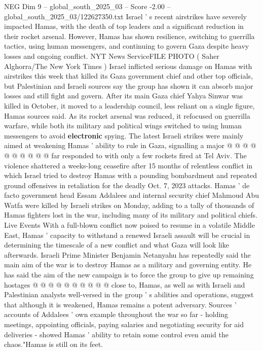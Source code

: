 \begin{textsample}{NEG Dim 9 – global\_south\_2025\_03 – Score -2.00 – global\_south\_2025\_03/122627350.txt}  \label{ex:f9_neg_325}
Israel ' s recent airstrikes have severely impacted Hamas, with the death of top leaders and a significant reduction in their rocket arsenal.
However, Hamas has shown resilience, switching to guerrilla tactics, using human messengers, and continuing to govern Gaza despite heavy losses and ongoing conflict.
NYT News ServiceFILE PHOTO ( Saher Alghorra/The New York Times ) Israel inflicted serious damage on Hamas with airstrikes this week that killed its Gaza government chief and other top officials, but Palestinian and Israeli sources say the group has shown it can absorb major losses and still fight and govern.
After its main Gaza chief Yahya Sinwar was killed in October, it moved to a leadership council, less reliant on a single figure, Hamas sources said.
As its rocket arsenal was reduced, it refocused on guerrilla warfare, while both its military and political wings switched to using human messengers to avoid \textbf{electronic} spying.
The latest Israeli strikes were mainly aimed at weakening Hamas ' ability to rule in Gaza, signalling a major @ @ @ @ @ @ @ @ @ @ far responded to with only a few rockets fired at Tel Aviv.
The violence shattered a weeks-long ceasefire after 15 months of relentless conflict in which Israel tried to destroy Hamas with a pounding bombardment and repeated ground offensives in retaliation for the deadly Oct. 7, 2023 attacks.
Hamas ' de facto government head Essam Addalees and internal security chief Mahmoud Abu Watfa were killed by Israeli strikes on Monday, adding to a tally of thousands of Hamas fighters lost in the war, including many of its military and political chiefs.
Live Events With a full-blown conflict now poised to resume in a volatile Middle East, Hamas ' capacity to withstand a renewed Israeli assault will be crucial in determining the timescale of a new conflict and what Gaza will look like afterwards.
Israeli Prime Minister Benjamin Netanyahu has repeatedly said the main aim of the war is to destroy Hamas as a military and governing entity.
He has said the aim of the new campaign is to force the group to give up remaining hostages @ @ @ @ @ @ @ @ @ @ close to, Hamas, as well as with Israeli and Palestinian analysts well-versed in the group ' s abilities and operations, suggest that although it is weakened, Hamas remains a potent adversary.
Sources ' accounts of Addalees ' own example throughout the war so far - holding meetings, appointing officials, paying salaries and negotiating security for aid deliveries - showed Hamas ' ability to retain some control even amid the chaos."Hamas is still on its feet.

\end{textsample}
